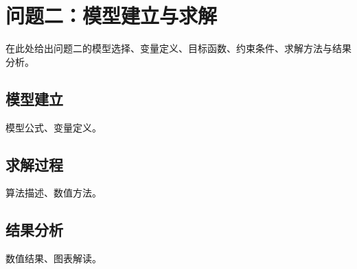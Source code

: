 \section{问题二：模型建立与求解}

在此处给出问题二的模型选择、变量定义、目标函数、约束条件、求解方法与结果分析。

\subsection{模型建立}

模型公式、变量定义。

\subsection{求解过程}

算法描述、数值方法。

\subsection{结果分析}

数值结果、图表解读。

